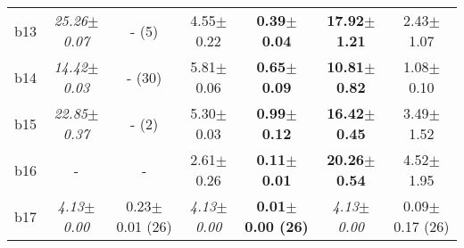 \begin{longtable}{|l|c|c|c|c|c|c|}
\\
b13&\textit{25.26$\pm$0.07} & - (5)&4.55$\pm$0.22 & \textbf{0.39$\pm$0.04}&\textbf{17.92$\pm$1.21} & 2.43$\pm$1.07
\\
b14&\textit{14.42$\pm$0.03} & - (30)&5.81$\pm$0.06 & \textbf{0.65$\pm$0.09}&\textbf{10.81$\pm$0.82} & 1.08$\pm$0.10
\\
b15&\textit{22.85$\pm$0.37} & - (2)&5.30$\pm$0.03 & \textbf{0.99$\pm$0.12}&\textbf{16.42$\pm$0.45} & 3.49$\pm$1.52
\\
b16&- & -&2.61$\pm$0.26 & \textbf{0.11$\pm$0.01}&\textbf{20.26$\pm$0.54} & 4.52$\pm$1.95
\\
b17&\textit{4.13$\pm$0.00} & 0.23$\pm$0.01 (26)&\textit{4.13$\pm$0.00} & \textbf{0.01$\pm$0.00 (26)}&\textit{4.13$\pm$0.00} & 0.09$\pm$0.17 (26)
\\
\hline
\end{longtable}
